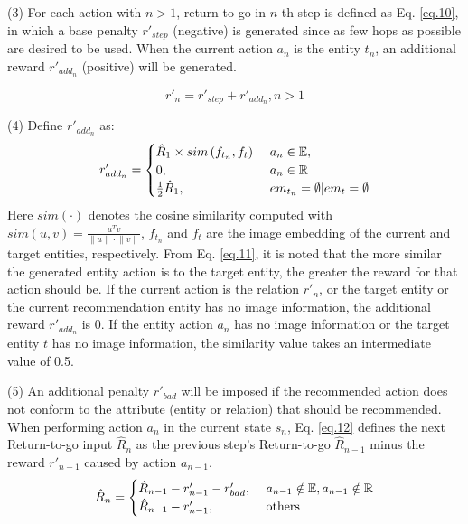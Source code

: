 \documentclass[10pt,journal,compsoc]{IEEEtran}
\newcommand{\for}{\text{ }}
\begin{document}
(3) For each action with $n>1$, return-to-go in $n$-th step is defined as Eq. \ref{eq.10}, in which a base penalty $r'_{step}$ (negative) is generated since as few hops as possible are desired to be used. When the current action $a_n$ is the entity $t_n$, an additional reward $r'_{{add}_n}$ (positive) will be generated.

\begin{equation} \label{eq.10}
{r'_n} = {r'_{step}} + {r'_{{add}_n}}, n > 1
\end{equation}

 (4) Define $r'_{{add}_n}$ as:
 \begin{equation}  \label{eq.11}
{r'_{{add}_n}} =  \begin{gathered}\begin{aligned}
\begin{cases}
{\hat R_1} \times sim\left( {{f_{{t_n}}},{f_t}} \right) & \for {a_n} \in \mathbb{E}, \hfill \\
  0,& \for {a_n} \in \mathbb{R} \hfill \\
  \frac{1}{2}{{\hat R}_1},& \for e{m_{{t_n}}} = \emptyset |e{m_t} = \emptyset  \hfill \\ 
 \end{cases}\end{aligned}
\end{gathered} 
\end{equation}
Here $sim(\cdot)$ denotes the cosine similarity computed with $sim\left( {u,v} \right) = \frac{{{u^T}v}}{{\left\| u \right\| \cdot \left\| v \right\|}}$, ${f}_{t_n}$ and ${f}_{t}$ are the image embedding of the current and target entities, respectively. From Eq. \ref{eq.11}, it is noted that the more similar the generated entity action is to the target entity, the greater the reward for that action should be. If the current action is the relation $r'_n$, or the target entity or the current recommendation entity has no image information, the additional reward $r'_{{add}_n}$ is 0. If the entity action $a_n$ has no image information or the target entity $t$ has no image information, the similarity value takes an intermediate value of 0.5. 


(5) An additional penalty $r'_{bad}$ will be imposed if the recommended action does not conform to the attribute (entity or relation) that should be recommended. When performing action $a_n$ in the current state $s_n$, Eq. \ref{eq.12} defines the next Return-to-go input $\hat R_n$ as the previous step's Return-to-go $\hat R_{n- 1}$ minus the reward $r'_{n-1}$ caused by action $a_{n-1}$.
\begin{equation}\label{eq.12}
{{\hat R}_n} =\begin{gathered}\begin{aligned}
\begin{cases}
  {{\hat R}_{n - 1}} - {r'_{n - 1}} - {r'_{bad}},& \for {a_{n - 1}} \notin \mathbb{E},{a_{n - 1}} \notin \mathbb{R} \hfill \\
  {{\hat R}_{n - 1}} - {r'_{n - 1}},& \for \text{others} \hfill \\ 
  \end{cases}\end{aligned}
\end{gathered} 
\end{equation}
\end{document}
